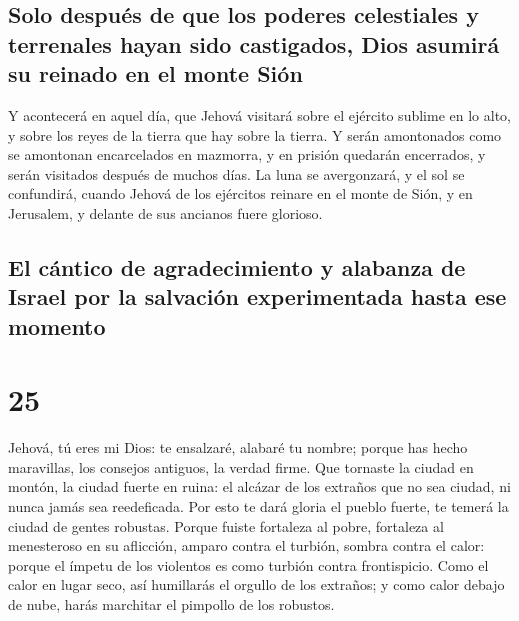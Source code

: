 \hypertarget{solo-despuuxe9s-de-que-los-poderes-celestiales-y-terrenales-hayan-sido-castigados-dios-asumiruxe1-su-reinado-en-el-monte-siuxf3n}{%
\subsection{Solo después de que los poderes celestiales y terrenales
hayan sido castigados, Dios asumirá su reinado en el monte
Sión}\label{solo-despuuxe9s-de-que-los-poderes-celestiales-y-terrenales-hayan-sido-castigados-dios-asumiruxe1-su-reinado-en-el-monte-siuxf3n}}

 Y acontecerá en aquel día, que Jehová visitará sobre el
ejército sublime en lo alto, y sobre los reyes de la tierra que hay
sobre la tierra.  Y serán amontonados como se amontonan
encarcelados en mazmorra, y en prisión quedarán encerrados, y serán
visitados después de muchos días.  La luna se avergonzará,
y el sol se confundirá, cuando Jehová de los ejércitos reinare en el
monte de Sión, y en Jerusalem, y delante de sus ancianos fuere glorioso.

\hypertarget{el-cuxe1ntico-de-agradecimiento-y-alabanza-de-israel-por-la-salvaciuxf3n-experimentada-hasta-ese-momento}{%
\subsection{El cántico de agradecimiento y alabanza de Israel por la
salvación experimentada hasta ese
momento}\label{el-cuxe1ntico-de-agradecimiento-y-alabanza-de-israel-por-la-salvaciuxf3n-experimentada-hasta-ese-momento}}

\hypertarget{section-24}{%
\section{25}\label{section-24}}

 Jehová, tú eres mi Dios: te ensalzaré, alabaré tu nombre;
porque has hecho maravillas, los consejos antiguos, la verdad firme.
 Que tornaste la ciudad en montón, la ciudad fuerte en
ruina: el alcázar de los extraños que no sea ciudad, ni nunca jamás sea
reedeficada.  Por esto te dará gloria el pueblo fuerte, te
temerá la ciudad de gentes robustas.  Porque fuiste
fortaleza al pobre, fortaleza al menesteroso en su aflicción, amparo
contra el turbión, sombra contra el calor: porque el ímpetu de los
violentos es como turbión contra frontispicio.  Como el
calor en lugar seco, así humillarás el orgullo de los extraños; y como
calor debajo de nube, harás marchitar el pimpollo de los robustos.

